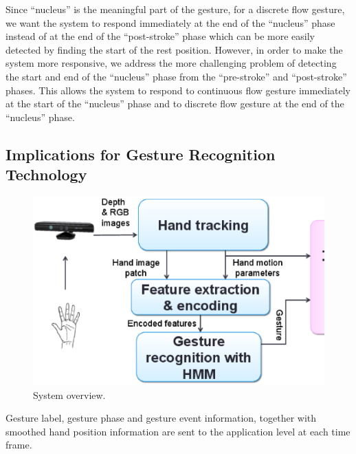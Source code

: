 \documentclass[conference]{IEEEtran}
\begin{document}
Since ``nucleus'' is the meaningful part of the gesture, for a discrete flow
gesture, we want the system to respond immediately at the end of the ``nucleus''
phase instead of at the end of the ``post-stroke'' phase which can be more
easily detected by finding the start of the rest position. However, in order to
make the system more responsive, we address the more challenging problem of
detecting the start and end of the ``nucleus'' phase from the ``pre-stroke''
and ``post-stroke'' phases. This allows the system to respond to continuous flow
gesture immediately at the start of the ``nucleus'' phase and to discrete flow
gesture at the end of the ``nucleus'' phase.

\subsection{Implications for Gesture Recognition Technology}


\begin{figure}[!t]
\centering
\includegraphics[width=\columnwidth]{fig/system_overview.ps}
\caption{System overview.}
\label{fig:system}
\end{figure}

Gesture label, gesture phase and gesture event information, together with
smoothed hand position information are sent to the application level at each
time frame.
\end{document}
